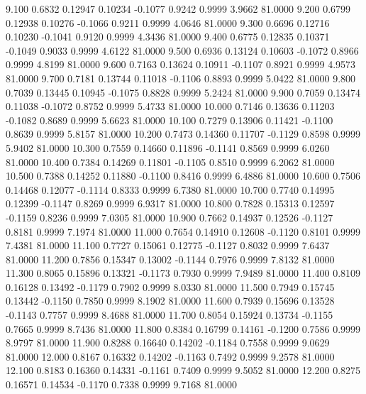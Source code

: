    9.100   0.6832   0.12947   0.10234  -0.1077   0.9242   0.9999   3.9662  81.0000
   9.200   0.6799   0.12938   0.10276  -0.1066   0.9211   0.9999   4.0646  81.0000
   9.300   0.6696   0.12716   0.10230  -0.1041   0.9120   0.9999   4.3436  81.0000
   9.400   0.6775   0.12835   0.10371  -0.1049   0.9033   0.9999   4.6122  81.0000
   9.500   0.6936   0.13124   0.10603  -0.1072   0.8966   0.9999   4.8199  81.0000
   9.600   0.7163   0.13624   0.10911  -0.1107   0.8921   0.9999   4.9573  81.0000
   9.700   0.7181   0.13744   0.11018  -0.1106   0.8893   0.9999   5.0422  81.0000
   9.800   0.7039   0.13445   0.10945  -0.1075   0.8828   0.9999   5.2424  81.0000
   9.900   0.7059   0.13474   0.11038  -0.1072   0.8752   0.9999   5.4733  81.0000
  10.000   0.7146   0.13636   0.11203  -0.1082   0.8689   0.9999   5.6623  81.0000
  10.100   0.7279   0.13906   0.11421  -0.1100   0.8639   0.9999   5.8157  81.0000
  10.200   0.7473   0.14360   0.11707  -0.1129   0.8598   0.9999   5.9402  81.0000
  10.300   0.7559   0.14660   0.11896  -0.1141   0.8569   0.9999   6.0260  81.0000
  10.400   0.7384   0.14269   0.11801  -0.1105   0.8510   0.9999   6.2062  81.0000
  10.500   0.7388   0.14252   0.11880  -0.1100   0.8416   0.9999   6.4886  81.0000
  10.600   0.7506   0.14468   0.12077  -0.1114   0.8333   0.9999   6.7380  81.0000
  10.700   0.7740   0.14995   0.12399  -0.1147   0.8269   0.9999   6.9317  81.0000
  10.800   0.7828   0.15313   0.12597  -0.1159   0.8236   0.9999   7.0305  81.0000
  10.900   0.7662   0.14937   0.12526  -0.1127   0.8181   0.9999   7.1974  81.0000
  11.000   0.7654   0.14910   0.12608  -0.1120   0.8101   0.9999   7.4381  81.0000
  11.100   0.7727   0.15061   0.12775  -0.1127   0.8032   0.9999   7.6437  81.0000
  11.200   0.7856   0.15347   0.13002  -0.1144   0.7976   0.9999   7.8132  81.0000
  11.300   0.8065   0.15896   0.13321  -0.1173   0.7930   0.9999   7.9489  81.0000
  11.400   0.8109   0.16128   0.13492  -0.1179   0.7902   0.9999   8.0330  81.0000
  11.500   0.7949   0.15745   0.13442  -0.1150   0.7850   0.9999   8.1902  81.0000
  11.600   0.7939   0.15696   0.13528  -0.1143   0.7757   0.9999   8.4688  81.0000
  11.700   0.8054   0.15924   0.13734  -0.1155   0.7665   0.9999   8.7436  81.0000
  11.800   0.8384   0.16799   0.14161  -0.1200   0.7586   0.9999   8.9797  81.0000
  11.900   0.8288   0.16640   0.14202  -0.1184   0.7558   0.9999   9.0629  81.0000
  12.000   0.8167   0.16332   0.14202  -0.1163   0.7492   0.9999   9.2578  81.0000
  12.100   0.8183   0.16360   0.14331  -0.1161   0.7409   0.9999   9.5052  81.0000
  12.200   0.8275   0.16571   0.14534  -0.1170   0.7338   0.9999   9.7168  81.0000
